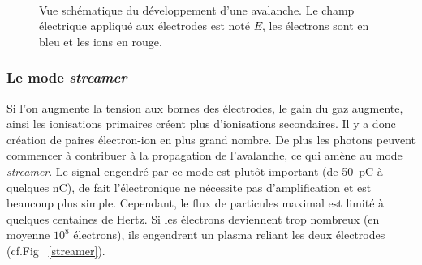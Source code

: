 \begin{figure}[ht!]
\centering
{}
\hfill
{}
\\
\hfill
{}
\caption{Vue schématique du développement d'une avalanche. Le champ électrique appliqué aux électrodes est noté $E$, les électrons sont en bleu et les ions en rouge.}
\label{avalanche}
\end{figure}

\subsubsection{Le mode \textit{streamer}}

Si l'on augmente la tension aux bornes des électrodes, le gain du gaz augmente, ainsi les ionisations primaires créent plus d'ionisations secondaires. Il y a donc création de paires électron-ion en plus grand nombre. De plus les photons peuvent commencer à contribuer à la propagation de l'avalanche, ce qui amène au mode \textit{streamer}. Le signal engendré par ce mode est plutôt important (de \SI{50}{\pico\coulomb} à quelques \si{\nano\coulomb}), de fait l'électronique ne nécessite pas d'amplification et est beaucoup plus simple. Cependant, le flux de particules maximal est limité à quelques centaines de Hertz. Si les électrons deviennent trop nombreux (en moyenne $10^{8}$ électrons), ils engendrent un plasma reliant les deux électrodes (cf.Fig~ \ref{streamer}).

